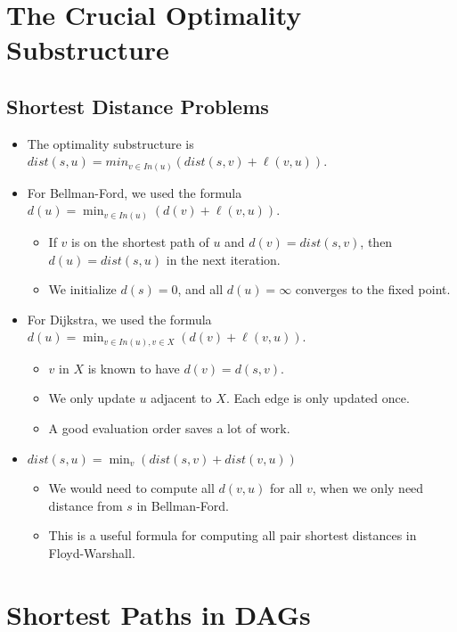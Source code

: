 \documentclass[12pt]{article}
\date{April 6, 2021}
\begin{document}
\maketitle

\section{The Crucial Optimality Substructure}

\subsection{Shortest Distance Problems}
\begin{itemize}
    \item The optimality substructure is $dist(s, u) = min_{v \in In(u)}(dist(s, v) + \ell(v, u))$.
    \item For Bellman-Ford, we used the formula $d(u) = \min_{v \in In(u)}(d(v) + \ell(v, u))$.
    \begin{itemize}
        \item If $v$ is on the shortest path of $u$ and $d(v) = dist(s, v)$, then $d(u) = dist(s, u)$ in the next iteration.
        \item We initialize $d(s) = 0$, and all $d(u) = \infty$ converges to the fixed point.
    \end{itemize}
    \item For Dijkstra, we used the formula $d(u) = \min_{v \in In(u), v \in X}(d(v) + \ell(v, u))$.
    \begin{itemize}
        \item $v$ in $X$ is known to have $d(v) = d(s, v)$.
        \item We only update $u$ adjacent to $X$. Each edge is only updated once.
        \item A good evaluation order saves a lot of work.
    \end{itemize}
    \item $dist(s, u) = \min_v(dist(s, v) + dist(v, u))$
    \begin{itemize}
        \item We would need to compute all $d(v, u)$ for all $v$, when we only need distance from $s$ in Bellman-Ford.
        \item This is a useful formula for computing all pair shortest distances in Floyd-Warshall.
    \end{itemize}
\end{itemize}

\section{Shortest Paths in DAGs}
\end{document}
